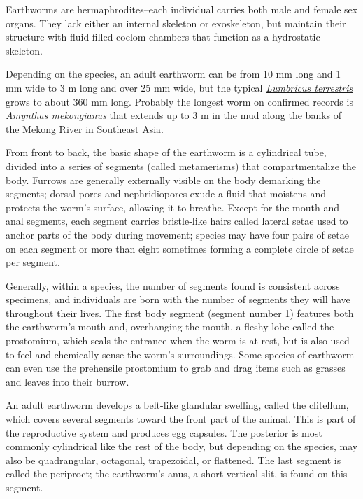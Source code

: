 Earthworms are hermaphrodites--each individual carries both male and
female sex organs. They lack either an internal skeleton or exoskeleton,
but maintain their structure with fluid-filled coelom chambers that
function as a hydrostatic skeleton.

Depending on the species, an adult earthworm can be from 10 mm long and
1 mm wide to 3 m long and over 25 mm wide, but the typical
\href{https://en.wikipedia.org/wiki/Lumbricus_terrestris}{\emph{Lumbricus
terrestris}} grows to about 360 mm long. Probably the longest worm on
confirmed records is
\href{https://en.wikipedia.org/wiki/Amynthas_mekongianus}{\emph{Amynthas
mekongianus}} that extends up to 3 m in the mud along the banks of the
Mekong River in Southeast Asia.

From front to back, the basic shape of the earthworm is a cylindrical
tube, divided into a series of segments (called metamerisms) that
compartmentalize the body. Furrows are generally externally visible on
the body demarking the segments; dorsal pores and nephridiopores exude a
fluid that moistens and protects the worm's surface, allowing it to
breathe. Except for the mouth and anal segments, each segment carries
bristle-like hairs called lateral setae used to anchor parts of the body
during movement; species may have four pairs of setae on each segment or
more than eight sometimes forming a complete circle of setae per
segment.

Generally, within a species, the number of segments found is consistent
across specimens, and individuals are born with the number of segments
they will have throughout their lives. The first body segment (segment
number 1) features both the earthworm's mouth and, overhanging the
mouth, a fleshy lobe called the prostomium, which seals the entrance
when the worm is at rest, but is also used to feel and chemically sense
the worm's surroundings. Some species of earthworm can even use the
prehensile prostomium to grab and drag items such as grasses and leaves
into their burrow.

An adult earthworm develops a belt-like glandular swelling, called the
clitellum, which covers several segments toward the front part of the
animal. This is part of the reproductive system and produces egg
capsules. The posterior is most commonly cylindrical like the rest of
the body, but depending on the species, may also be quadrangular,
octagonal, trapezoidal, or flattened. The last segment is called the
periproct; the earthworm's anus, a short vertical slit, is found on this
segment.

